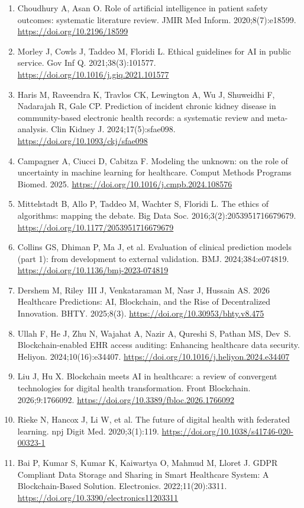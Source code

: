 \begin{enumerate}
  prediction and distribution-free uncertainty quantification. Found
  Trends Mach Learn. 2023;16(4):494--591.
  \url{https://doi.org/10.1561/2200000101}
\item
  Choudhury A, Asan O. Role of artificial intelligence in patient safety
  outcomes: systematic literature review. JMIR Med Inform.
  2020;8(7):e18599. \url{https://doi.org/10.2196/18599}
\item
  Morley J, Cowls J, Taddeo M, Floridi L. Ethical guidelines for AI in
  public service. Gov Inf Q. 2021;38(3):101577.
  \url{https://doi.org/10.1016/j.giq.2021.101577}
\item
  Haris M, Raveendra K, Travlos CK, Lewington A, Wu J, Shuweidhi F,
  Nadarajah R, Gale CP. Prediction of incident chronic kidney disease in
  community-based electronic health records: a systematic review and
  meta-analysis. Clin Kidney J. 2024;17(5):sfae098.
  \url{https://doi.org/10.1093/ckj/sfae098}
\item
  Campagner A, Ciucci D, Cabitza F. Modeling the unknown: on the role of
  uncertainty in machine learning for healthcare. Comput Methods
  Programs Biomed. 2025.
  \url{https://doi.org/10.1016/j.cmpb.2024.108576}
\item
  Mittelstadt B, Allo P, Taddeo M, Wachter S, Floridi L. The ethics of
  algorithms: mapping the debate. Big Data Soc.
  2016;3(2):2053951716679679.
  \url{https://doi.org/10.1177/2053951716679679}
\item
  Collins GS, Dhiman P, Ma J, et al. Evaluation of clinical prediction
  models (part 1): from development to external validation. BMJ.
  2024;384:e074819. \url{https://doi.org/10.1136/bmj-2023-074819}
\item
  Dershem M, Riley~III J, Venkataraman M, Nasr J, Hussain AS. 2026
  Healthcare Predictions: AI, Blockchain, and the Rise of Decentralized
  Innovation. BHTY. 2025;8(3).
  \url{https://doi.org/10.30953/bhty.v8.475}
\item
  Ullah F, He J, Zhu N, Wajahat A, Nazir A, Qureshi S, Pathan MS,
  Dev~S. Blockchain-enabled EHR access auditing: Enhancing healthcare
  data security. Heliyon. 2024;10(16):e34407.
  \url{https://doi.org/10.1016/j.heliyon.2024.e34407}
\item
  Liu J, Hu X. Blockchain meets AI in healthcare: a review of convergent
  technologies for digital health transformation. Front Blockchain.
  2026;9:1766092. \url{https://doi.org/10.3389/fbloc.2026.1766092}
\item
  Rieke N, Hancox J, Li W, et al. The future of digital health with
  federated learning. npj Digit Med. 2020;3(1):119.
  \url{https://doi.org/10.1038/s41746-020-00323-1}
\item
  Bai P, Kumar S, Kumar K, Kaiwartya O, Mahmud M, Lloret J. GDPR
  Compliant Data Storage and Sharing in Smart Healthcare System: A
  Blockchain-Based Solution. Electronics. 2022;11(20):3311.
  \url{https://doi.org/10.3390/electronics11203311}
\end{enumerate}
